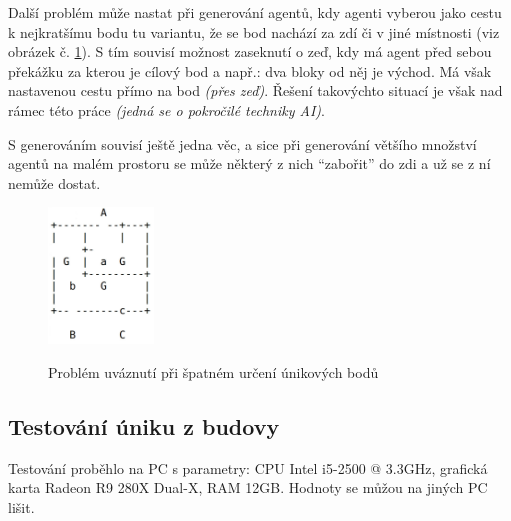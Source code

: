 \documentclass[czech,public,dept460,male,cpdeclaration]{diploma}
\begin{document}
Další problém může nastat při generování agentů, kdy agenti vyberou jako cestu \\k nejkratšímu bodu tu variantu, že se bod nachází za zdí či v jiné místnosti (viz obrázek č. \ref{fig:buildingEscapeProblem1}). S tím souvisí možnost zaseknutí o zeď, kdy má agent před sebou překážku za kterou je cílový bod a např.: dva bloky od něj je východ. Má však nastavenou cestu přímo na bod \textit{(přes zeď)}. Řešení takovýchto situací je však nad rámec této práce \textit{(jedná se o pokročilé techniky AI)}.

S generováním souvisí ještě jedna věc, a sice při generování většího množství agentů na malém prostoru se může některý z nich ``zabořit'' do zdi a už se z ní nemůže dostat. 

\begin{figure}[H]\centering\includegraphics[width=0.25\textwidth]{Figures/buildingEscapeProblem2.jpg}\label{fig:buildingEscapeProblem1}
	\caption{Problém uváznutí při špatném určení únikových bodů}
	\label{fig:buildingEscapeProblem1}
\end{figure}

\subsection{Testování úniku z budovy}\label{sec:testovani-uniku-z-budovy}

Testování proběhlo na PC s parametry: CPU Intel i5-2500 @ 3.3GHz, grafická karta Radeon R9 280X Dual-X, RAM 12GB. Hodnoty se můžou na jiných PC lišit.


\end{document}
